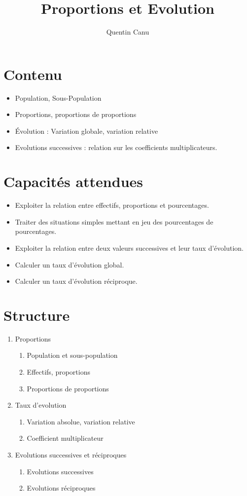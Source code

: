 \documentclass{article}
\title{Proportions et Evolution}
\date{}
\author{Quentin Canu}
\begin{document}
\maketitle
\section*{Contenu}
\begin{itemize}
\item Population, Sous-Population 
\item Proportions, proportions de proportions
\item \'Evolution : Variation globale, variation relative
\item Evolutions successives : relation sur les coefficients multiplicateurs. 
\end{itemize}
\section*{Capacités attendues}
\begin{itemize}
\item Exploiter la relation entre effectifs, proportions et pourcentages.
\item Traiter des situations simples mettant en jeu des pourcentages de pourcentages.
\item Exploiter la relation entre deux valeurs successives et leur taux d'évolution.
\item Calculer un taux d'évolution global.
\item Calculer un taux d'évolution réciproque. 
\end{itemize}
\section*{Structure}
\begin{enumerate}
\item Proportions
\begin{enumerate}
\item Population et sous-population\label{sect-populations}
\item Effectifs, proportions\label{sect-effectifs}
\item Proportions de proportions\label{sect-proportions-de-proportions}
\end{enumerate}
\item Taux d'evolution
\begin{enumerate}
\item Variation absolue, variation relative \label{sect-variations}
\item Coefficient multiplicateur \label{sect-CM}
\end{enumerate}
\item Evolutions successives et réciproques
\begin{enumerate}
\item Evolutions successives \label{sect-successives}
\item Evolutions réciproques
\end{enumerate}
\end{enumerate}
\end{document}
